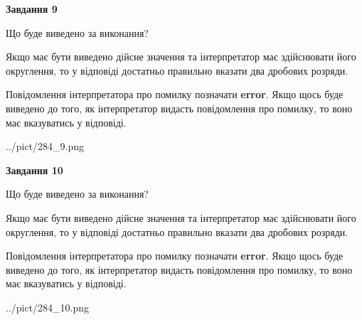 \documentclass[12pt, ukrainian]{article}
\begin{document}
{\begin {Large}
{\begin {center}\textbf{Завдання 9}\end {center}}\par
Що буде виведено за виконання? \par

Якщо має бути виведено дійсне значення та інтерпретатор має здійснювати його округлення, 
то у відповіді достатньо правильно вказати два дробових розряди.

Повідомлення інтерпретатора про помилку позначати \textbf{error}.
Якщо щось буде виведено до того, як інтерпретатор видасть повідомлення про помилку, 
то воно має вказуватись у відповіді. \par

\begin{center}
	{../pict/284_9.png}
\end{center}
\newpage

{\begin {center}\textbf{Завдання 10}\end {center}}\par
Що буде виведено за виконання? \par

Якщо має бути виведено дійсне значення та інтерпретатор має здійснювати його округлення, 
то у відповіді достатньо правильно вказати два дробових розряди.

Повідомлення інтерпретатора про помилку позначати \textbf{error}.
Якщо щось буде виведено до того, як інтерпретатор видасть повідомлення про помилку, 
то воно має вказуватись у відповіді. \par

\begin{center}
	{../pict/284_10.png}
\end{center}
\newpage

\end {Large}}
\end{document}
